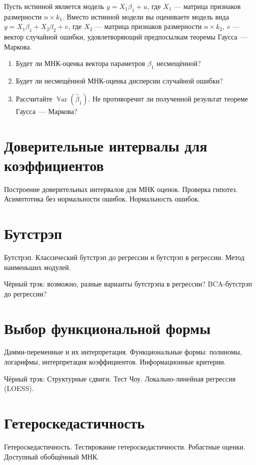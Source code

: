 \documentclass[12pt]{article}
\DeclareMathOperator{\Var}{\mathbb{V}ar}
\renewcommand{\b}{\beta}
\newcommand{\hb}{\hat{\beta}}
\begin{document}
\begin{problem}
Пусть истинной является модель $y = X_1\b_1+u$, где $X_1$ --- матрица признаков размерности $n \times k_1$. Вместо истинной модели вы оцениваете модель вида $y = X_1\b_1+ X_2\b_2+v$, где $X_2$  --- матрица признаков размерности  $n \times k_2$, $v$ --- вектор случайной ошибки, удовлетворяющий предпосылкам теоремы Гаусса~--- Маркова.
\begin{enumerate}
    \item Будет ли МНК-оценка вектора параметров $\b_1$ несмещённой?
    \item Будет ли несмещённой МНК-оценка дисперсии случайной ошибки?
    \item Рассчитайте $\Var(\hb_1)$. Не противоречит ли полученной результат теореме Гаусса~--- Маркова?
\end{enumerate}
\end{problem}

\section{Доверительные интервалы для коэффициентов}
Построение доверительных интервалов для МНК оценок. Проверка гипотез. Асимптотика без нормальности ошибок. Нормальность ошибок.

\section{Бутстрэп}
Бутстрэп. Классический бутстрэп до регрессии и бутстрэп в регрессии. Метод наименьших модулей.

Чёрный трэк: возможно, разные варианты бутстрэпа в регрессии? BCA-бутстрэп до регрессии?

\section{Выбор функциональной формы}
Дамми-переменные и их интерпретация. Функциональные формы: полиномы, логарифмы, интерпретация коэффициентов. Информационные критерии.

Чёрный трэк: Структурные сдвиги. Тест Чоу. Локально-линейная регрессия (LOESS).

\section{Гетероскедастичность}
Гетероскедастичность. Тестирование гетероскедастичности. Робастные оценки. Доступный обобщённый МНК.
\end{document}
